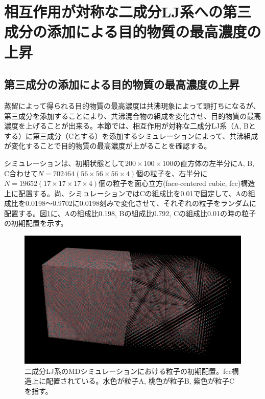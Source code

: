 \documentclass[titlepage]{jsreport}
\begin{document}
\section{相互作用が対称な二成分LJ系への第三成分の添加による目的物質の最高濃度の上昇} \label{method-sec:bi-component-addition-of-3rd-component-highest-purity}
\subsection{第三成分の添加による目的物質の最高濃度の上昇} \label{method-subsec:bi-component-addition-of-3rd-component-highest-purity}
蒸留によって得られる目的物質の最高濃度は共沸現象によって頭打ちになるが、第三成分を添加することにより、共沸混合物の組成を変化させ、目的物質の最高濃度を上げることが出来る\cite{azeotrope-add_third_component}。本節では、相互作用が対称な二成分LJ系（A, Bとする）に第三成分（Cとする）を添加するシミュレーションによって、共沸組成が変化することで目的物質の最高濃度が上がることを確認する。

シミュレーションは、初期状態として$200×100×100$の直方体の左半分にA, B, C合わせて$N=702464(56×56×56×4)$個の粒子を、右半分に$N=19652(17×17×17×4)$個の粒子を面心立方(face-centered cubic, fcc)構造上に配置する。尚、シミュレーションではCの組成比を0.01で固定して、Aの組成比を0.0198〜0.9702に0.0198刻みで変化させて、それぞれの粒子をランダムに配置する。図\ref{fig:lan139088-lbn556351-lcn7025-ran3891-rbn15564-rcn197-first}に、Aの組成比0.198, Bの組成比0.792, Cの組成比0.01の時の粒子の初期配置を示す。

\begin{figure}[htbp]
    \begin{center}
        \includegraphics[width=14cm]{fig/lan278176-lbn417263-lcn7025-ran7782-rbn11673-rcn197/lan139088-lbn556351-lcn7025-ran3891-rbn15564-rcn197-first.png}
    \end{center}
    \caption{二成分LJ系のMDシミュレーションにおける粒子の初期配置。fcc構造上に配置されている。水色が粒子A, 桃色が粒子B, 紫色が粒子Cを指す。}
    \label{fig:lan139088-lbn556351-lcn7025-ran3891-rbn15564-rcn197-first}
\end{figure}
\end{document}
